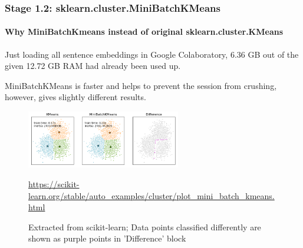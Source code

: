 \documentclass{tum-presentation}
\begin{document}
\begin{frame}[fragile]
  \frametitle{Stage 1.2: sklearn.cluster.MiniBatchKMeans}
  \framesubtitle{Why MiniBatchKmeans instead of original sklearn.cluster.KMeans}
  \begin{description}
    \item  Just loading all sentence embeddings in Google Colaboratory, 6.36 GB out of the given 12.72 GB RAM had already been used up. 
  
    \item  MiniBatchKMeans is faster and helps to prevent the session from crushing, however, gives slightly different results.
  \end{description}


  \begin{figure}[t]
    \includegraphics[width=0.60\textwidth]{images/sphx_glr_plot_mini_batch_kmeans_001.png}
    \caption{Extracted from scikit-learn; Data points classified differently are shown as purple points in 'Difference' block}
    \url{https://scikit-learn.org/stable/auto_examples/cluster/plot_mini_batch_kmeans.html}
  \end{figure}
\end{frame}
\end{document}
